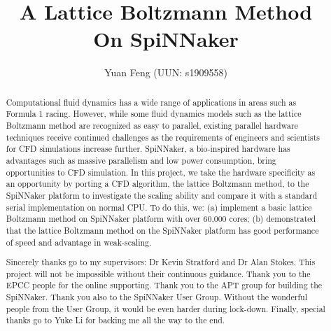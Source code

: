 \documentclass[12pt, twoside]{article}
\title{A Lattice Boltzmann Method \\ On SpiNNaker }
\author{Yuan Feng (UUN: s1909558)}
\begin{document}


\newpage
\begin{abstract}


\noindent Computational fluid dynamics has a wide range of applications in areas such as Formula 1 racing. However, while some fluid dynamics models such as the lattice Boltzmann method are recognized as easy to parallel, existing parallel hardware techniques receive continued challenges as the requirements of engineers and scientists for CFD simulations increase further. SpiNNaker, a bio-inspired hardware has advantages such as massive parallelism and low power consumption, bring opportunities to CFD simulation. In this project, we take the hardware specificity as an opportunity by porting a CFD algorithm, the lattice Boltzmann method, to the SpiNNaker platform to investigate the scaling ability and compare it with a standard serial implementation on normal CPU. To do this, we: (a) implement a basic lattice Boltzmann method on SpiNNaker platform with over 60,000 cores; (b) demonstrated that the lattice Boltzmann method on the SpiNNaker platform has good performance of speed and advantage in weak-scaling.

\end{abstract}



\newpage
\renewcommand{\abstractname}{Acknowledgements}
\begin{abstract}

\noindent Sincerely thanks go to my supervisors: Dr Kevin Stratford and Dr Alan Stokes. This project will not be impossible without their continuous guidance. Thank you to the EPCC people for the online supporting. Thank you to the APT group for building the SpiNNaker. Thank you also to the SpiNNaker User Group. Without the wonderful people from the User Group, it would be even harder during lock-down. Finally, special thanks go to Yuke Li for backing me all the way to the end.

\end{abstract}


\newpage
\tableofcontents

\newpage

\newpage

\newpage

\newpage

\newpage

\newpage


\newpage
%
%


\newpage
\listoffigures

\newpage
\listoftables
\end{document}
